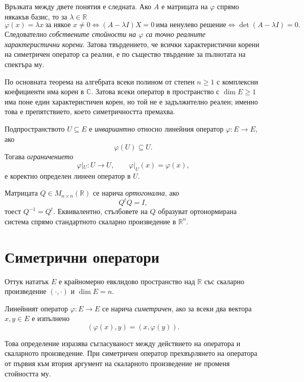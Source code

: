 Връзката между двете понятия е следната. Ако $A$ е матрицата на $\varphi$ спрямо някакъв базис, то за $\lambda\in\mathbb{R}$
\[
\varphi(x)=\lambda x\ \text{за някое }x\ne0
\iff
(A-\lambda I)X=0\ \text{има ненулево решение}
\iff
\det(A-\lambda I)=0 .
\]
Следователно \emph{собствените стойности на $\varphi$ са точно реалните характеристични корени}. Затова твърдението, че всички характеристични корени на симетричен оператор са реални, е по същество твърдение за пълнотата на спектъра му.

\begin{remark}
По основната теорема на алгебрата всеки полином от степен $n\geq1$ с комплексни коефициенти има корен в $\mathbb{C}$. Затова всеки оператор в пространство с $\dim E\geq1$ има поне един характеристичен корен, но той не е задължително реален; именно това е препятствието, което симетричността премахва.
\end{remark}

\begin{defn}
Подпространството $U\subseteq E$ е \emph{инвариантно} относно линейния оператор $\varphi:E\to E$, ако
\[
\varphi(U)\subseteq U.
\]
Тогава \emph{ограничението}
\[
\varphi|_U:U\to U,
\qquad
\varphi|_U(x)=\varphi(x),
\]
е коректно определен линеен оператор в $U$.
\end{defn}

\begin{defn}
Матрицата $Q\in M_{n\times n}(\mathbb{R})$ се нарича \emph{ортогонална}, ако
\[
Q^tQ=I,
\]
тоест $Q^{-1}=Q^t$. Еквивалентно, стълбовете на $Q$ образуват ортонормирана система спрямо стандартното скаларно произведение в $\mathbb{R}^n$.
\end{defn}

\section{Симетрични оператори}\label{s:30.2}

Оттук нататък $E$ е крайномерно евклидово пространство над $\mathbb{R}$ със скаларно произведение $(\cdot,\cdot)$ и $\dim E=n$.

\begin{defn}
Линейният оператор $\varphi:E\to E$ се нарича \emph{симетричен}, ако за всеки два вектора $x,y\in E$ е изпълнено
\[
(\varphi(x),y)=(x,\varphi(y)).
\]
\end{defn}

Това определение изразява съгласуваност между действието на оператора и скаларното произведение. При симетричен оператор прехвърлянето на оператора от първия към втория аргумент на скаларното произведение не променя стойността му.

